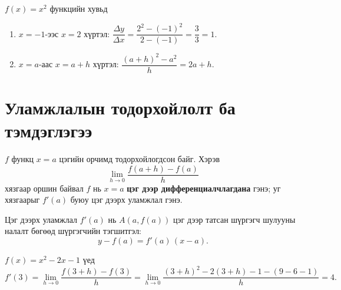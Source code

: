 \begin{example}
$f(x)=x^2$ функцийн хувьд
\begin{enumerate}
  \item $x=-1$-ээс $x=2$ хүртэл: $\dfrac{\Delta y}{\Delta x}=\dfrac{2^2-(-1)^2}{2-(-1)}=\dfrac{3}{3}=1$.
  \item $x=a$-аас $x=a+h$ хүртэл: $\dfrac{(a+h)^2-a^2}{h}=2a+h$.
\end{enumerate}
\end{example}
\section{Уламжлалын тодорхойлолт ба тэмдэглэгээ}

\begin{definition}
$f$ функц $x=a$ цэгийн орчимд тодорхойлогдсон байг. Хэрэв
\[
\lim_{h\to 0}\frac{f(a+h)-f(a)}{h}
\]
хязгаар оршин байвал $f$ нь $x=a$ \textbf{цэг дээр дифференциалчлагдана} гэнэ; уг хязгаарыг $f'(a)$ буюу цэг дээрх уламжлал гэнэ.
\end{definition}

\begin{note}
Цэг дээрх уламжлал $f'(a)$ нь $A(a,f(a))$ цэг дээр татсан шүргэгч шулууны налалт бөгөөд шүргэгчийн тэгшитгэл:
\[
y - f(a) = f'(a)\,(x-a).
\]
\end{note}

\begin{example}
$f(x)=x^2-2x-1$ үед
\[
f'(3)=\lim_{h\to 0}\frac{f(3+h)-f(3)}{h}
=\lim_{h\to 0}\frac{(3+h)^2-2(3+h)-1 - (9-6-1)}{h}=4.
\]
\end{example}

\begin{center}
\end{center}

